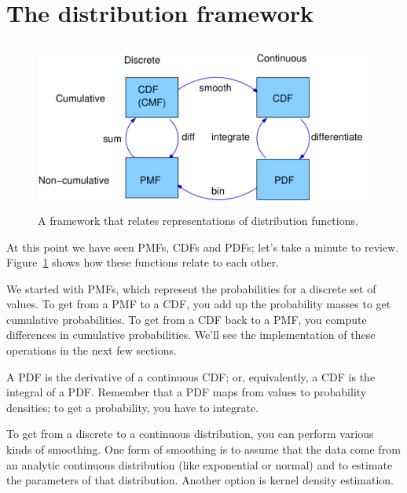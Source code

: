\documentclass[12pt]{book}
\begin{document}
\section{The distribution framework}

\begin{figure}
\centerline{\includegraphics[height=2.2in]{figs/distribution_functions.pdf}}
\caption{A framework that relates representations of distribution
functions.}
\label{dist_framework}
\end{figure}

At this point we have seen PMFs, CDFs and PDFs; let's take a minute
to review.  Figure~\ref{dist_framework} shows how these functions relate
to each other.

We started with PMFs, which represent the probabilities for a discrete
set of values.  To get from a PMF to a CDF, you add up the probability
masses to get cumulative probabilities.  
To get from a CDF back to a PMF, you compute differences in cumulative
probabilities.  We'll see the implementation of these operations
in the next few sections.

A PDF is the derivative of a continuous CDF; or, equivalently,
a CDF is the integral of a PDF.  Remember that a PDF maps from
values to probability densities; to get a probability, you have to
integrate.

To get from a discrete to a continuous distribution, you can perform
various kinds of smoothing.  One form of smoothing is to assume that
the data come from an analytic continuous distribution
(like exponential or normal) and to estimate the parameters of that
distribution.  Another option is kernel density estimation.
\end{document}
